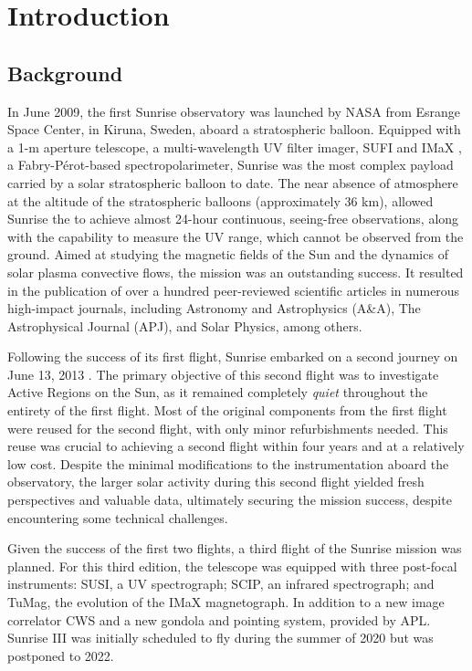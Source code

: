 \chapter{Introduction}




\section{Background}

In June 2009, the first Sunrise observatory \citep{SunriseI} was launched by NASA from Esrange Space Center, in Kiruna, Sweden, aboard a stratospheric balloon. Equipped with a 1-m aperture telescope, a multi-wavelength UV filter imager, SUFI \citep{SUFI} and IMaX \citep{IMaX}, a Fabry-Pérot-based spectropolarimeter, Sunrise was the most complex payload carried by a solar stratospheric balloon to date. The near absence of atmosphere at the altitude of the stratospheric balloons (approximately 36 km), allowed Sunrise the to achieve almost 24-hour continuous, seeing-free observations, along with the capability to measure the UV range, which cannot be observed from the ground. Aimed at studying the magnetic fields of the Sun and the dynamics of solar plasma convective flows, the mission was an outstanding success. It resulted in the publication of over a hundred peer-reviewed scientific articles in numerous high-impact journals, including Astronomy and Astrophysics (A\&A), The Astrophysical Journal (APJ), and Solar Physics, among others.

Following the success of its first flight, Sunrise embarked on a second journey  on June 13, 2013 \citep{SunriseII}. The primary objective of this second flight was to investigate Active Regions on the Sun, as it remained completely \textit{quiet} throughout the entirety of the first flight. Most of the original components from the first flight were reused for the second flight, with only minor refurbishments needed. This reuse was crucial to achieving a second flight within four years and at a relatively low cost. Despite the minimal modifications to the instrumentation aboard the observatory, the larger solar activity during this second flight yielded fresh perspectives and valuable data, ultimately securing the mission success, despite encountering some technical challenges.

Given the success of the first two flights, a third flight of the Sunrise mission was planned. For this third edition, the telescope was equipped with three post-focal instruments: SUSI, a UV spectrograph; SCIP, an infrared spectrograph; and TuMag, the evolution of the IMaX magnetograph. In addition to a new image correlator CWS and a new gondola and pointing system, provided by APL. Sunrise III was initially scheduled to fly during the summer of 2020 but was postponed to 2022.

